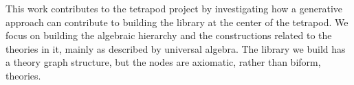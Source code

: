 This work contributes to the tetrapod project by investigating how a generative approach can contribute to building the library at the center of the tetrapod. We focus on building the algebraic hierarchy and the constructions related to the theories in it, mainly as described by universal algebra. The library we build has a theory graph structure, but the nodes are axiomatic, rather than biform, theories. 





